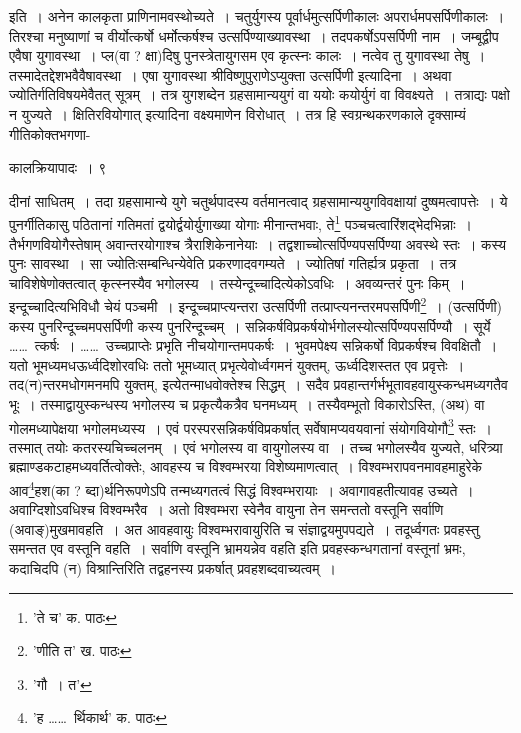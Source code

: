 \documentclass[11pt, openany]{book}
\begin{document}
इति~। अनेन कालकृता प्राणिनामवस्थोच्यते~। चतुर्युगस्य पूर्वार्धमुत्सर्पिणीकालः अपरार्धमपसर्पिणीकालः~। तिरश्चा मनुष्याणां च वीर्योत्कर्षो धर्मोत्कर्षश्च उत्सर्पिण्याख्यावस्था~। तदपकर्षोऽपसर्पिणी नाम~। जम्बूद्वीप एवैषा युगावस्था~। प्ल(वा ? क्षा)दिषु पुनस्त्रेतायुगसम एव कृत्स्नः
कालः~। नत्वेव तु युगावस्था तेषु~। तस्मादेतद्देशभवैवैषावस्था~। एषा युगावस्था श्रीविष्णुपुराणेऽप्युक्ता {\qt उत्सर्पिणी} इत्यादिना~। अथवा
ज्योतिर्गतिविषयमेवैतत् सूत्रम्~। तत्र युगशब्देन ग्रहसामान्ययुगं वा ययोः कयोर्युगं वा विवक्ष्यते~। तत्राद्यः पक्षो न युज्यते~। {\qt क्षितिरवियोगात्} इत्यादिना वक्ष्यमाणेन विरोधात्~। तत्र हि स्वग्रन्थकरणकाले दृक्साम्यं गीतिकोक्तभगणा-

\newpage

\vspace{3cm} \hspace{4cm}कालक्रियापादः~। \hspace{4cm}९ 

\vspace{0.3cm}
\noindent दीनां साधितम्~। तदा ग्रहसामान्ये युगे चतुर्थपादस्य वर्तमानत्वाद् ग्रहसामान्ययुगविवक्षायां दुष्षमत्वापत्तेः~। ये पुनर्गीतिकासु पठितानां गतिमतां द्वयोर्द्वयोर्युगाख्या योगाः मीनान्तभवाः, ते\renewcommand{\thefootnote}{१}\footnote{'ते च' क. पाठः} पञ्चचत्वारिंशद्भेदभिन्नाः~। तैर्भगणवियोगैस्तेषाम् अवान्तरयोगाश्च त्रैराशिकेनानेयाः~। तद्वशाच्चोत्सर्पिण्यपसर्पिण्या अवस्थे स्तः~। कस्य पुनः सावस्था~। सा ज्योतिःसम्बन्धिन्येवेति प्रकरणादवगम्यते~। ज्योतिषां गतिर्ह्यत्र प्रकृता~। तत्र चाविशेषेणोक्तत्वात् कृत्स्नस्यैव भगोलस्य~। तस्येन्दूच्चादित्येकोऽवधिः~। अवव्यन्तरं पुनः किम्~। इन्दूच्चादित्यभिविधौ चेयं पञ्चमी~। इन्दूच्चप्राप्त्यन्तरा उत्सर्पिणी तत्प्राप्त्यनन्तरमपसर्पिणी\renewcommand{\thefootnote}{२}\footnote{'णीति त' ख. पाठः}~। (उत्सर्पिणी) कस्य
पुनरिन्दूच्चमपसर्पिणी कस्य पुनरिन्दूच्चम्~। सन्निकर्षविप्रकर्षयोर्भगोलस्योत्सर्पिण्यपसर्पिण्यौ~। सूर्ये \ldots \ldots\ त्कर्षः~। \ldots \ldots\ उच्चप्राप्तेः प्रभृति नीचयोगान्तमपकर्षः~। भुवमपेक्ष्य सन्निकर्षो विप्रकर्षश्च विवक्षितौ~। यतो भूमध्यमधऊर्ध्वदिशोरवधिः ततो भूमध्यात् प्रभृत्येवोर्ध्वगमनं युक्तम्, ऊर्ध्वदिशस्तत एव प्रवृत्तेः~। तद(न)न्तरमधोगमनमपि युक्तम्, इत्येतन्माधवोक्तेश्च सिद्धम्~। सदैव प्रवहान्तर्गर्भभूतावहवायुस्कन्धमध्यगतैव भूः~। तस्माद्वायुस्कन्धस्य भगोलस्य च प्रकृत्यैकत्रैव घनमध्यम्~। तस्यैवम्भूतो विकारोऽस्ति, (अथ) वा गोलमध्यापेक्षया भगोलमध्यस्य~। एवं परस्परसन्निकर्षविप्रकर्षात्
सर्वेषामप्यवयवानां संयोगवियोगौ\renewcommand{\thefootnote}{३}\footnote{'गौ~। त'} स्तः~। तस्मात् तयोः कतरस्यचिच्चलनम्~। एवं भगोलस्य वा वायुगोलस्य वा~। तच्च भगोलस्यैव युज्यते, धरित्र्या ब्रह्माण्डकटाहमध्यवर्तित्वोक्तेः, आवहस्य च विश्वम्भरया विशेष्यमाणत्वात्~। {\qt विश्वम्भरापवनमावहमाहुरेके} आव\renewcommand{\thefootnote}{४}\footnote{'ह \ldots \ldots\ र्थिकार्थ' क. पाठः}हश(का ? ब्दा)र्थनिरूपणेऽपि तन्मध्यगतत्वं सिद्धं विश्वम्भरायाः~। अवागावहतीत्यावह उच्यते~। अवाग्दिशोऽवधिश्च विश्वम्भरैव~। अतो विश्वम्भरा स्वेनैव वायुना तेन समन्ततो वस्तूनि सर्वाणि (अवाङ्)मुखमावहति~। अत आवहवायुः विश्वम्भरावायुरिति च संज्ञाद्वयमुपपद्यते~। तदूर्ध्वगतः प्रवहस्तु समन्तत एव वस्तूनि वहति~। सर्वाणि वस्तूनि भ्रामयन्नेव वहति इति प्रवहस्कन्धगतानां वस्तूनां भ्रमः, कदाचिदपि (न) विश्रान्तिरिति तद्वहनस्य प्रकर्षात् प्रवहशब्दवाच्यत्वम्~।
\end{document}
